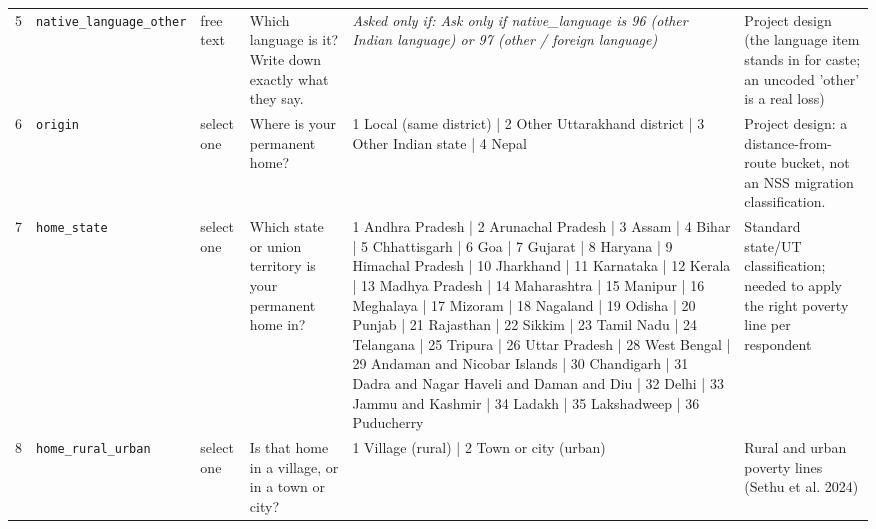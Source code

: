 \documentclass[9pt,a4paper,landscape]{article}
\begin{document}
\begin{longtable}{@{}p{0.5cm}p{3.3cm}p{1.7cm}p{7.3cm}p{5.6cm}p{5.4cm}@{}}
\footnotesize 5 & \footnotesize\texttt{native\_language\_other} & \scriptsize free text & \footnotesize Which language is it? Write down exactly what they say.\par\vspace{1pt}{\footnotesize\color{hdr}{\hifont वह कौन सी भाषा है? जैसा वे कहें वैसा ही लिख लीजिए।}} & \scriptsize \textit{Asked only if: Ask only if native\_language is 96 (other Indian language) or 97 (other / foreign language)} & \scriptsize Project design (the language item stands in for caste; an uncoded 'other' is a real loss)\\
\footnotesize 6 & \footnotesize\texttt{origin} & \scriptsize select one & \footnotesize Where is your permanent home?\par\vspace{1pt}{\footnotesize\color{hdr}{\hifont आपका पक्का घर कहाँ है?}} & \scriptsize 1 Local (same district) | 2 Other Uttarakhand district | 3 Other Indian state | 4 Nepal & \scriptsize Project design: a distance-from-route bucket, not an NSS migration classification.\\
\footnotesize 7 & \footnotesize\texttt{home\_state} & \scriptsize select one & \footnotesize Which state or union territory is your permanent home in?\par\vspace{1pt}{\footnotesize\color{hdr}{\hifont वह घर किस राज्य में है? (अगर भारत से बाहर है तो वह बताइए।)}} & \scriptsize 1 Andhra Pradesh | 2 Arunachal Pradesh | 3 Assam | 4 Bihar | 5 Chhattisgarh | 6 Goa | 7 Gujarat | 8 Haryana | 9 Himachal Pradesh | 10 Jharkhand | 11 Karnataka | 12 Kerala | 13 Madhya Pradesh | 14 Maharashtra | 15 Manipur | 16 Meghalaya | 17 Mizoram | 18 Nagaland | 19 Odisha | 20 Punjab | 21 Rajasthan | 22 Sikkim | 23 Tamil Nadu | 24 Telangana | 25 Tripura | 26 Uttar Pradesh | 28 West Bengal | 29 Andaman and Nicobar Islands | 30 Chandigarh | 31 Dadra and Nagar Haveli and Daman and Diu | 32 Delhi | 33 Jammu and Kashmir | 34 Ladakh | 35 Lakshadweep | 36 Puducherry & \scriptsize Standard state/UT classification; needed to apply the right poverty line per respondent\\
\footnotesize 8 & \footnotesize\texttt{home\_rural\_urban} & \scriptsize select one & \footnotesize Is that home in a village, or in a town or city?\par\vspace{1pt}{\footnotesize\color{hdr}{\hifont वह घर गाँव में है, या क़स्बे या शहर में?}} & \scriptsize 1 Village (rural) | 2 Town or city (urban) & \scriptsize Rural and urban poverty lines (Sethu et al. 2024)\\

\end{longtable}
\end{document}
